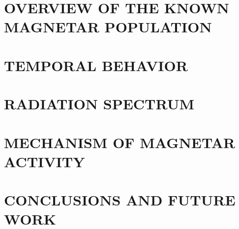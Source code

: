 \documentclass[letterpaper]{ar-1col}
\begin{document}
%
%


\section{OVERVIEW OF THE KNOWN MAGNETAR POPULATION}
\label{sec:overview}


\section{TEMPORAL BEHAVIOR}
\label{sec:temporal}


\section{RADIATION SPECTRUM}
\label{sec:spectral}


\section{MECHANISM OF MAGNETAR ACTIVITY}
\label{sec:andrei}


\section{CONCLUSIONS AND FUTURE WORK}
\label{sec:conclusions}

\end{document}
